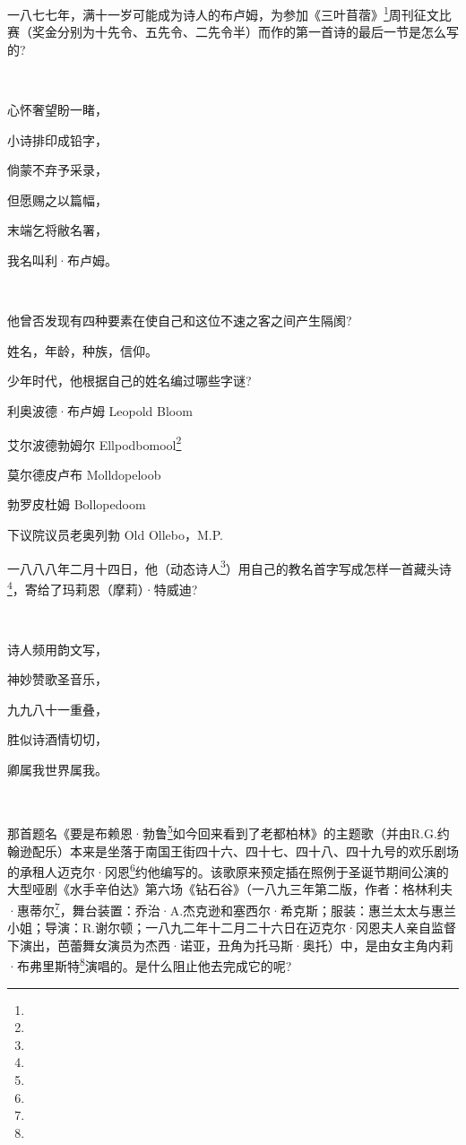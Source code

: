 \par 一八七七年，满十一岁可能成为诗人的布卢姆，为参加《三叶苜蓿》\footnote{}周刊征文比赛（奖金分别为十先令、五先令、二先令半）而作的第一首诗的最后一节是怎么写的?
\par  
\par 心怀奢望盼一睹，
\par 小诗排印成铅字，
\par 倘蒙不弃予采录，
\par 但愿赐之以篇幅，
\par 末端乞将敝名署，
\par 我名叫利·布卢姆。
\par  
\par 他曾否发现有四种要素在使自己和这位不速之客之间产生隔阂?
\par 姓名，年龄，种族，信仰。
\par 少年时代，他根据自己的姓名编过哪些字谜?
\par 利奥波德·布卢姆 Leopold Bloom
\par 艾尔波德勃姆尔 Ellpodbomool\footnote{}
\par 莫尔德皮卢布 Molldopeloob
\par 勃罗皮杜姆 Bollopedoom
\par 下议院议员老奥列勃 Old Ollebo，M.P.
\par 一八八八年二月十四日，他（动态诗人\footnote{}）用自己的教名首字写成怎样一首藏头诗\footnote{}，寄给了玛莉恩（摩莉）·特威迪?
\par  
\par 诗人频用韵文写，
\par 神妙赞歌圣音乐，
\par 九九八十一重叠，
\par 胜似诗酒情切切，
\par 卿属我世界属我。
\par  
\par 那首题名《要是布赖恩·勃鲁\footnote{}如今回来看到了老都柏林》的主题歌（并由R.G.约翰逊配乐）本来是坐落于南国王街四十六、四十七、四十八、四十九号的欢乐剧场的承租人迈克尔·冈恩\footnote{}约他编写的。该歌原来预定插在照例于圣诞节期间公演的大型哑剧《水手辛伯达》第六场《钻石谷》（一八九三年第二版，作者：格林利夫·惠蒂尔\footnote{}，舞台装置：乔治·A.杰克逊和塞西尔·希克斯；服装：惠兰太太与惠兰小姐；导演：R.谢尔顿；一八九二年十二月二十六日在迈克尔·冈恩夫人亲自监督下演出，芭蕾舞女演员为杰西·诺亚，丑角为托马斯·奥托）中，是由女主角内莉·布弗里斯特\footnote{}演唱的。是什么阻止他去完成它的呢?
